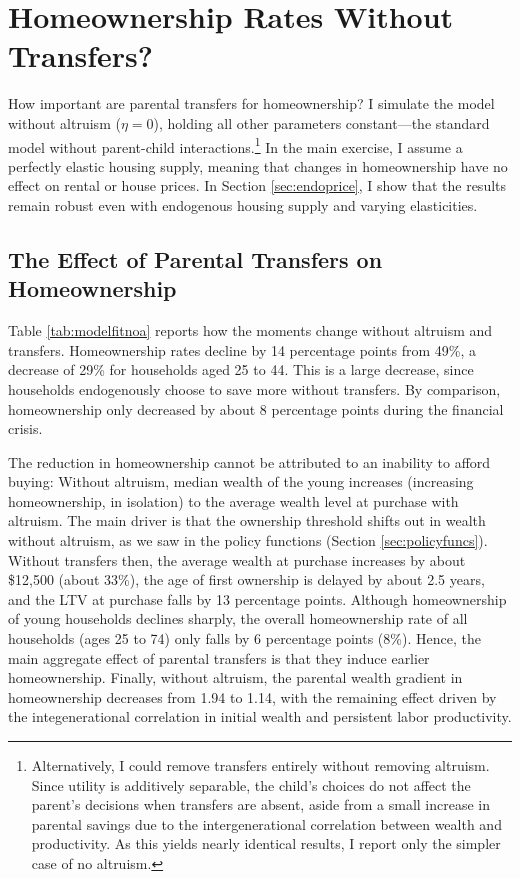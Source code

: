 \documentclass[12pt]{article}
\begin{document}
\section{Homeownership Rates Without Transfers?}\label{sec:quant}
How important are parental transfers for homeownership? I simulate the model without altruism ($\eta=0$), holding all other parameters constant---the standard model without parent-child interactions.\footnote{Alternatively, I could remove transfers entirely without removing altruism. Since utility is additively separable, the child's choices do not affect the parent's decisions when transfers are absent, aside from a small increase in parental savings due to the intergenerational correlation between wealth and productivity. As this yields nearly identical results, I report only the simpler case of no altruism.} In the main exercise, I assume a perfectly elastic housing supply, meaning that changes in homeownership have no effect on rental or house prices. In Section \ref{sec:endoprice}, I show that the results remain robust even with endogenous housing supply and varying elasticities.

\subsection{The Effect of Parental Transfers on Homeownership}
Table \ref{tab:modelfitnoa} reports how the moments change without altruism and transfers. Homeownership rates decline by 14 percentage points from 49\%, a decrease of 29\% for households aged 25 to 44. This is a large decrease, since households endogenously choose to save more without transfers. By comparison, homeownership only decreased by about 8 percentage points during the financial crisis.

The reduction in homeownership cannot be attributed to an inability to afford buying: Without altruism, median wealth of the young increases (increasing homeownership, in isolation) to the average wealth level at purchase with altruism. The main driver is that the ownership threshold shifts out in wealth without altruism, as we saw in the policy functions (Section \ref{sec:policyfuncs}). Without transfers then, the average wealth at purchase increases by about \$12,500 (about 33\%), the age of first ownership is delayed by about 2.5 years, and the LTV at purchase falls by 13 percentage points. Although homeownership of young households declines sharply, the overall homeownership rate of all households (ages 25 to 74) only falls by 6 percentage points (8\%). Hence, the main aggregate effect of parental transfers is that they induce earlier homeownership. Finally, without altruism, the parental wealth gradient in homeownership decreases from 1.94 to 1.14, with the remaining effect driven by the integenerational correlation in initial wealth and persistent labor productivity.
\end{document}
